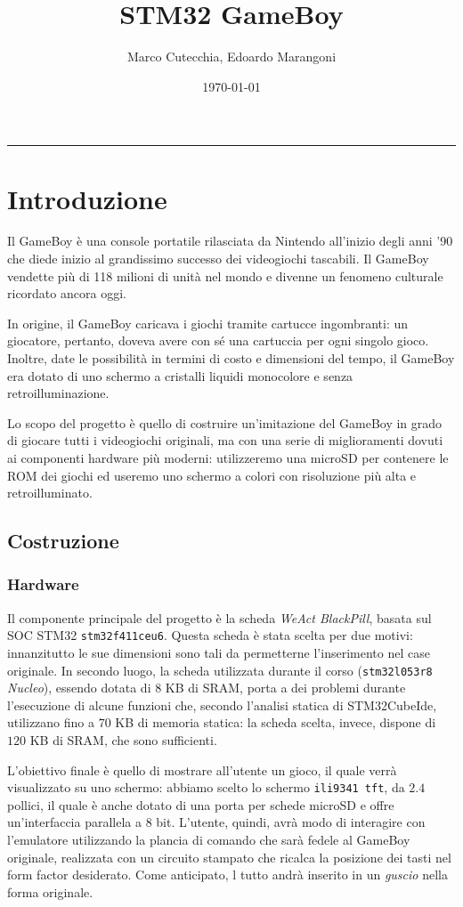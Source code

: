 \documentclass[12pt]{article}
\title{STM32 GameBoy}
\date{\today}
\author{Marco Cutecchia, Edoardo Marangoni}
\begin{document}
\maketitle
\begin{center}\rule{0.5\linewidth}{0.5pt}\end{center}

\section{Introduzione}
Il GameBoy è una console portatile rilasciata da Nintendo all'inizio degli anni
'90 che diede inizio al grandissimo successo dei videogiochi tascabili. Il
GameBoy vendette più di 118 milioni di unità nel mondo e divenne un fenomeno
culturale ricordato ancora oggi.

In origine, il GameBoy caricava i giochi tramite cartucce ingombranti: un
giocatore, pertanto, doveva avere con sé una cartuccia per ogni singolo gioco.
Inoltre, date le possibilità in termini di costo e dimensioni del tempo, il
GameBoy era dotato di uno schermo a cristalli liquidi monocolore e senza
retroilluminazione. 

Lo scopo del progetto è quello di costruire un'imitazione del GameBoy in grado
di giocare tutti i videogiochi originali, ma con una serie di miglioramenti
dovuti ai componenti hardware più moderni: utilizzeremo una microSD per
contenere le ROM dei giochi ed useremo uno schermo a colori con risoluzione più
alta e retroilluminato.

\subsection{Costruzione}
\subsubsection{Hardware}
Il componente principale del progetto è la scheda \emph{WeAct BlackPill}, basata
sul SOC STM32 \texttt{stm32f411ceu6}. Questa scheda è stata scelta per due
motivi: innanzitutto le sue dimensioni sono tali da permetterne l'inserimento
nel case originale. In secondo luogo, la scheda utilizzata durante il corso
(\texttt{stm32l053r8} \textit{Nucleo}), essendo dotata di $8$ KB di SRAM, porta
a dei problemi durante l'esecuzione di alcune funzioni che, secondo l'analisi
statica di STM32CubeIde, utilizzano fino a $70$ KB di memoria statica: la scheda scelta,
invece, dispone di $120$ KB di SRAM, che sono sufficienti.

L'obiettivo finale è quello di mostrare all'utente un gioco, il quale verrà
visualizzato su uno schermo: abbiamo scelto lo schermo \texttt{ili9341 tft}, da
$2.4$ pollici, il quale è anche dotato di una porta per schede microSD e offre
un'interfaccia parallela a $8$ bit. L'utente, quindi, avrà modo di interagire
con l'emulatore utilizzando la plancia di comando che sarà fedele al GameBoy
originale, realizzata con un circuito stampato che ricalca la posizione dei
tasti nel form factor desiderato. Come anticipato, l tutto andrà inserito in un
\emph{guscio} nella forma originale.
\end{document}
